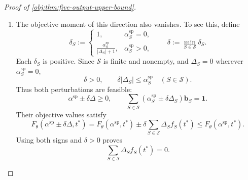 \documentclass[11pt]{article}
\begin{document}
\begin{proof}[Proof of \cref{obj:thm:five-output-upper-bound}]
\begin{enumerate}
Suppose that \(|\mathcal K_{\mathrm{sp}}|>5\).
The more than five columns
\[
\begin{pmatrix}\mathbf b_S\\ \dot f_S(t^*)\end{pmatrix}
\in\mathbb R^5,
\qquad S\in\mathcal K_{\mathrm{sp}},
\]
are linearly dependent. Extending their dependence coefficients by zero
outside \(\mathcal K_{\mathrm{sp}}\) gives
\[
\begin{gathered}
\Delta=(\Delta_S)_{S\in\mathcal S}
\in\mathbb R^{\mathcal S}\setminus\{0\},
\qquad
\Delta_S=0\quad(S\notin\mathcal K_{\mathrm{sp}}),\\
\sum_{S\in\mathcal S}\Delta_S\mathbf b_S=0,
\qquad
\sum_{S\in\mathcal S}\Delta_S\dot f_S(t^*)=0.
\end{gathered}
\]

\item
The objective moment of this direction also vanishes.
To see this, define
\[
\delta_S:=
\begin{cases}
1,&\alpha^{\mathrm{sp}}_S=0,\\
\displaystyle\frac{\alpha^{\mathrm{sp}}_S}{|\Delta_S|+1},
&\alpha^{\mathrm{sp}}_S>0,
\end{cases}
\qquad
\delta:=\min_{S\in\mathcal S}\delta_S.
\]
Each \(\delta_S\) is positive. Since \(\mathcal S\) is finite and
nonempty, and \(\Delta_S=0\) wherever \(\alpha^{\mathrm{sp}}_S=0\),
\[
\delta>0,
\qquad
\delta|\Delta_S|\le\alpha^{\mathrm{sp}}_S
\quad(S\in\mathcal S).
\]
Thus both perturbations are feasible:
\[
\alpha^{\mathrm{sp}}\pm\delta\Delta\ge0,
\qquad
\sum_{S\in\mathcal S}
(\alpha^{\mathrm{sp}}_S\pm\delta\Delta_S)\mathbf b_S
=\mathbf1.
\]
Their objective values satisfy
\[
F_\theta(\alpha^{\mathrm{sp}}\pm\delta\Delta,t^*)
=
F_\theta(\alpha^{\mathrm{sp}},t^*)
\pm\delta\sum_{S\in\mathcal S}\Delta_Sf_S(t^*)
\le F_\theta(\alpha^{\mathrm{sp}},t^*).
\]
Using both signs and \(\delta>0\) proves
\[
\sum_{S\in\mathcal S}\Delta_Sf_S(t^*)=0.
\]


\end{enumerate}
\end{proof}
\end{document}
